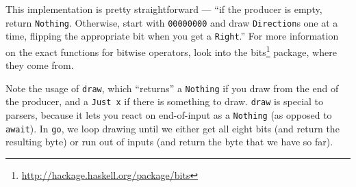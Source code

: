 \documentclass[]{article}
\newenvironment{Shaded}{}{}
\newcommand{\CommentTok}[1]{\textcolor[rgb]{0.38,0.63,0.69}{\textit{#1}}}
\newcommand{\DataTypeTok}[1]{\textcolor[rgb]{0.56,0.13,0.00}{#1}}
\newcommand{\DecValTok}[1]{\textcolor[rgb]{0.25,0.63,0.44}{#1}}
\newcommand{\FunctionTok}[1]{\textcolor[rgb]{0.02,0.16,0.49}{#1}}
\newcommand{\KeywordTok}[1]{\textcolor[rgb]{0.00,0.44,0.13}{\textbf{#1}}}
\newcommand{\NormalTok}[1]{#1}
\newcommand{\OtherTok}[1]{\textcolor[rgb]{0.00,0.44,0.13}{#1}}
\renewcommand{\href}[2]{#2\footnote{\url{#1}}}
\begin{document}
\begin{Shaded}
\end{Shaded}

This implementation is pretty straightforward --- ``if the producer is empty,
return \texttt{Nothing}. Otherwise, start with \texttt{00000000} and draw
\texttt{Direction}s one at a time, flipping the appropriate bit when you get a
\texttt{Right}.'' For more information on the exact functions for bitwise
operators, look into the \href{http://hackage.haskell.org/package/bits}{bits}
package, where they come from.

Note the usage of \texttt{draw}, which ``returns'' a \texttt{Nothing} if you
draw from the end of the producer, and a \texttt{Just\ x} if there is something
to draw. \texttt{draw} is special to parsers, because it lets you react on
end-of-input as a \texttt{Nothing} (as opposed to \texttt{await}). In
\texttt{go}, we loop drawing until we either get all eight bits (and return the
resulting byte) or run out of inputs (and return the byte that we have so far).
\end{document}
